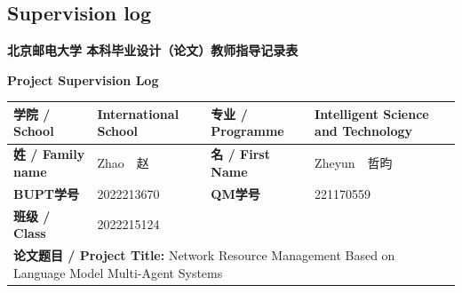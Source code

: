 \subsection*{Supervision log}
{}


\begin{center}
\textbf{北京邮电大学 本科毕业设计（论文）教师指导记录表}

\textbf{Project Supervision Log}
\end{center}

\vspace{0.3cm}

\begin{table}[h]
\centering
\renewcommand{\arraystretch}{1.3}
\begin{tabular}{|p{2.5cm}|p{3.5cm}|p{2.5cm}|p{5.5cm}|}
\hline
\textbf{学院 / School} & International School & \textbf{专业 / Programme} & Intelligent Science and Technology \\
\hline
\textbf{姓 / Family name} & Zhao~~赵 & \textbf{名 / First Name} & Zheyun~~哲昀 \\
\hline
\textbf{BUPT学号} & 2022213670 & \textbf{QM学号} & 221170559 \\
\hline
\textbf{班级 / Class} & 2022215124 & & \\
\hline
\multicolumn{4}{|p{15.5cm}|}{\textbf{论文题目 / Project Title:} Network Resource Management Based on Language Model Multi-Agent Systems} \\
\hline
\end{tabular}
\end{table}

\vspace{0.3cm}

